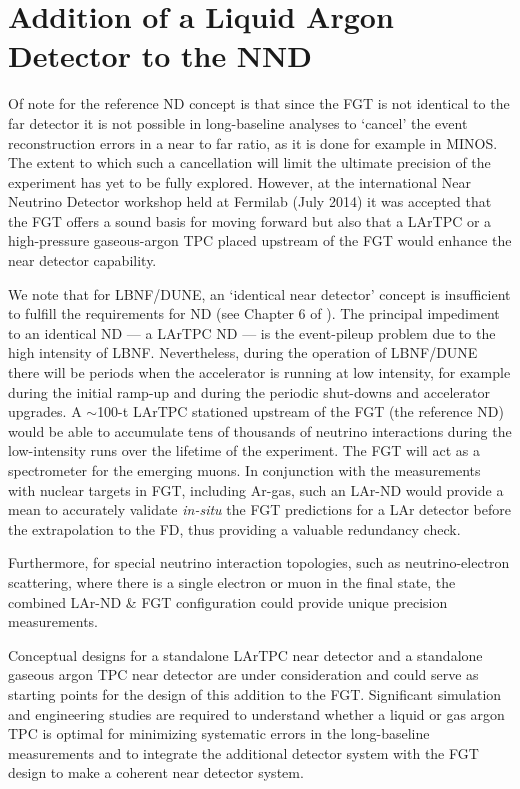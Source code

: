 \section{Addition of a Liquid Argon Detector to the NND}
\label{sec:detectors-nd-alt}

Of note for the reference ND concept is that since the FGT is not
identical to the far detector it is not possible in long-baseline
analyses to `cancel' the event reconstruction errors in a near to far
ratio, as it is done for example in MINOS.  The extent to which such a
cancellation will limit the ultimate precision of the experiment has
yet to be fully explored.  However, at the international Near Neutrino
Detector workshop held at Fermilab (July 2014) it was accepted that
the FGT offers a sound basis for moving forward but also that a LArTPC
or a high-pressure gaseous-argon TPC placed upstream of the FGT would
enhance the near detector capability.


We note that for LBNF/DUNE, an `identical near detector' concept
is insufficient to fulfill the requirements for ND
(see Chapter 6 of \volphys). The principal impediment to an
identical ND --- a LArTPC ND --- is the event-pileup problem
due to the high intensity of LBNF. Nevertheless, during the operation
of LBNF/DUNE there will be periods when the accelerator is running at
low intensity, for example during the initial ramp-up and during the
periodic shut-downs and accelerator upgrades. A $\sim$100-t LArTPC
stationed upstream of the FGT (the reference ND) would be able to
accumulate tens of thousands of neutrino interactions during the
low-intensity runs over the lifetime of the experiment.  The FGT will
act as a spectrometer for the emerging muons. In conjunction with the
measurements with nuclear targets in FGT, including Ar-gas, such an
LAr-ND would provide a mean to accurately validate {\em in-situ} the
FGT predictions for a LAr detector before the extrapolation to the FD,
thus providing a valuable redundancy check.

Furthermore, for special neutrino interaction topologies, such as
neutrino-electron scattering, where there is a single electron or muon
in the final state, the combined LAr-ND \& FGT configuration could
provide unique precision measurements.

Conceptual designs for a standalone LArTPC near detector and a
standalone gaseous argon TPC near detector are under consideration and
could serve as starting points for the design of this addition to the
FGT.  Significant simulation and engineering studies are required to
understand whether a liquid or gas argon TPC is optimal for minimizing
systematic errors in the long-baseline measurements and to integrate
the additional detector system with the FGT design to make a coherent
near detector system.

